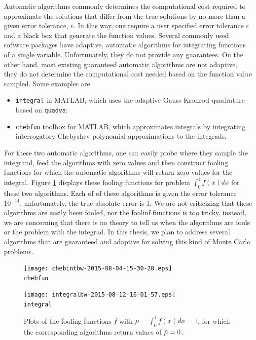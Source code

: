 \documentclass{iitthesis}
\begin{document}
Automatic algorithms commonly determines the computational cost required to approximate the solutions that differ from the true solutions by no more than a given error tolerance, $\varepsilon$. In this way, one require a user specified error tolerance $\varepsilon$ and a black box that generate the function values. Several commonly used software packages have adaptive, automatic algorithms for integrating functions of a single variable. Unfortunately, they do not provide any guarantees. On the other hand, most existing guaranteed automatic algorithms are not adaptive, they do not determine the computational cost needed based on the function value sampled. Some examples are
\begin{itemize}
\item {\tt integral} \cite{Shampone08} in MATLAB, which uses the adaptive Gauss-Kronrod quadrature based on {\tt quadva};
\item {\tt chebfun} toolbox \cite{Chebfun14} for MATLAB, which approximates integrals by integrating interrogatory Chebyshev polynomial approximations to the integrads.
\end{itemize}
For these two automatic algorithms, one can easily probe where they sample the integrand, feed the algorithms with zero values and then construct fooling functions for which the automatic algorithms will return zero values for the integral. Figure \ref{fig:foolingfun} displays these fooling functions for problem $\int_0^1f(x)dx$ for these two algorithms. Each of of these algorithms is given the error tolerance $10^{-14}$, unfortunately, the true absolute error is 1. We are not criticizing that these algorithms are easily been fooled, nor the foolinf functions is too tricky, instead, we are concerning that there is no theory to tell us when the algorithms are fools or the problem with the integrad.
In this thesis, we plan to address several algorithms that are guaranteed and adaptive for solving this kind of Monte Carlo problems.
\begin{figure}[htbp]
\centering
\begin{minipage}{7cm}\centering 
\texttt{[image: chebintbw-2015-08-04-15-30-28.eps]} \\ {\tt chebfun}  \end{minipage}%
\begin{minipage}{7cm}\centering 
\texttt{[image: integralbw-2015-08-12-16-01-57.eps]} \\{\tt integral}
\end{minipage}
\caption{Plots of the fooling functions $f$ with $\mu = \int_0^1f(x)dx=1$, for which the corresponding algorithms return values of $\hat{\mu}=0$.}\label{fig:foolingfun}
 \end{figure}
 
\end{document}
